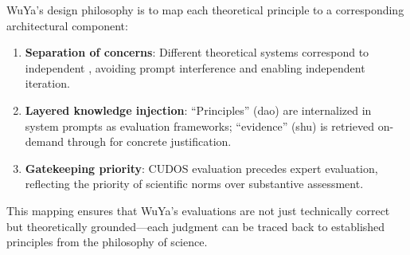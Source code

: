 WuYa's design philosophy is to map each theoretical principle to a corresponding architectural component:

\begin{enumerate}
    \item \textbf{Separation of concerns}: Different theoretical systems correspond to independent \subagents{}, avoiding prompt interference and enabling independent iteration.
    \item \textbf{Layered knowledge injection}: ``Principles'' (dao) are internalized in system prompts as evaluation frameworks; ``evidence'' (shu) is retrieved on-demand through \rag{} for concrete justification.
    \item \textbf{Gatekeeping priority}: CUDOS evaluation precedes expert evaluation, reflecting the priority of scientific norms over substantive assessment.
\end{enumerate}

This mapping ensures that WuYa's evaluations are not just technically correct but theoretically grounded---each judgment can be traced back to established principles from the philosophy of science.

